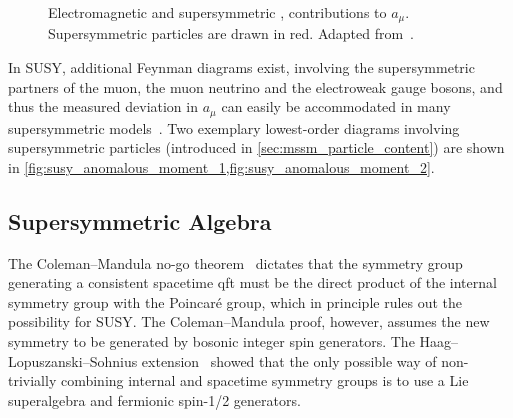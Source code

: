 \begin{figure}
\begin{subfigure}[b]{0.33\linewidth}
		\caption{\label{fig:susy_anomalous_moment_2}}
	\end{subfigure}	
	\caption{Electromagnetic  and supersymmetric ,  contributions to $a_\mu$. Supersymmetric particles are drawn in red. Adapted from~\cite{baer_tata_2006}.}\label{fig:loop_corrections_anomalous_moment}
\end{figure}

In SUSY, additional Feynman diagrams exist, involving the supersymmetric partners of the muon, the muon neutrino and the electroweak gauge bosons, and thus the measured deviation in $a_\mu$ can easily be accommodated in many supersymmetric models~\cite{Czarnecki:2001pv,Feng:2001tr}. Two exemplary lowest-order diagrams involving supersymmetric particles (introduced in \cref{sec:mssm_particle_content}) are shown in \cref{fig:susy_anomalous_moment_1,fig:susy_anomalous_moment_2}.


\subsection{Supersymmetric Algebra}\label{sec:susy_algebra}

The Coleman--Mandula no-go theorem~\cite{PhysRev.159.1251} dictates that the symmetry group generating a consistent spacetime \gls{qft} must be the direct product of the internal symmetry group with the Poincaré group, which in principle rules out the possibility for SUSY. The Coleman--Mandula proof, however, assumes the new symmetry to be generated by bosonic integer spin generators. The Haag--Lopuszanski--Sohnius extension~\cite{Haag:1974qh} showed that the only possible way of non-trivially combining internal and spacetime symmetry groups is to use a Lie superalgebra and fermionic spin-1/2 generators.

